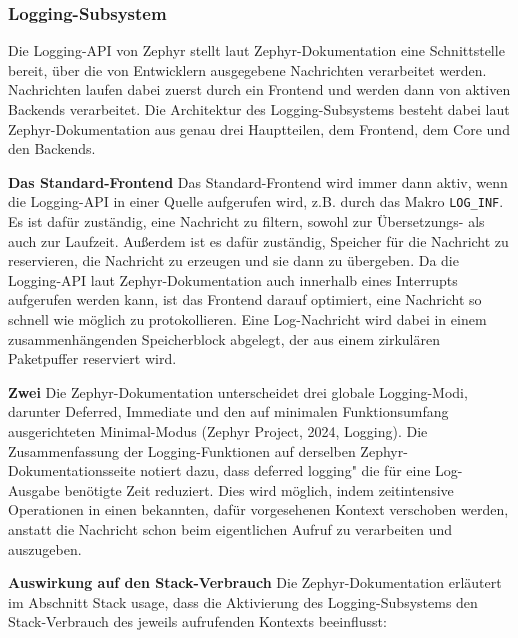\subsubsection{Logging-Subsystem}
Die Logging-API von Zephyr stellt laut Zephyr-Dokumentation eine Schnittstelle bereit, {\"u}ber die von Entwicklern ausgegebene Nachrichten verarbeitet werden. Nachrichten laufen dabei zuerst durch ein Frontend und werden dann von aktiven Backends verarbeitet. Die Architektur des Logging-Subsystems besteht dabei laut Zephyr-Dokumentation aus genau drei Hauptteilen, dem Frontend, dem Core und den Backends.

\textbf{Das Standard-Frontend} Das Standard-Frontend wird immer dann aktiv, wenn die Logging-API in einer Quelle aufgerufen wird, z.B. durch das Makro \lstinline[style=codeinline]|LOG_INF|. Es ist daf{\"u}r zust{\"a}ndig, eine Nachricht zu filtern, sowohl zur {\"U}bersetzungs- als auch zur Laufzeit. Au{\ss}erdem ist es daf{\"u}r zust{\"a}ndig, Speicher f{\"u}r die Nachricht zu reservieren, die Nachricht zu erzeugen und sie dann zu {\"u}bergeben. Da die Logging-API laut Zephyr-Dokumentation auch innerhalb eines Interrupts aufgerufen werden kann, ist das Frontend darauf optimiert, eine Nachricht so schnell wie m{\"o}glich zu protokollieren. Eine Log-Nachricht wird dabei in einem zusammenh{\"a}ngenden Speicherblock abgelegt, der aus einem \glqq{}zirkul{\"a}ren Paketpuffer\grqq{} reserviert wird.

\textbf{Zwei }Die Zephyr-Dokumentation unterscheidet drei globale Logging-Modi, darunter Deferred, Immediate und den auf minimalen Funktionsumfang ausgerichteten Minimal-Modus (Zephyr Project, 2024, \glqq{}Logging\grqq{}). Die Zusammenfassung der Logging-Funktionen auf derselben Zephyr-Dokumentationsseite notiert dazu, dass \glqq{}deferred logging" die f{\"u}r eine Log-Ausgabe ben{\"o}tigte Zeit reduziert. Dies wird m{\"o}glich, indem zeitintensive Operationen in einen bekannten, daf{\"u}r vorgesehenen Kontext verschoben werden, anstatt die Nachricht schon beim eigentlichen Aufruf zu verarbeiten und auszugeben.

\textbf{Auswirkung auf den Stack-Verbrauch} Die Zephyr-Dokumentation erl{\"a}utert im Abschnitt \glqq{}Stack usage\grqq{}, dass die Aktivierung des Logging-Subsystems den Stack-Verbrauch des jeweils aufrufenden Kontexts beeinflusst:

